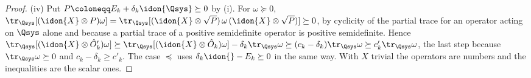 \begin{proof}
(iv) Put $P\coloneqq E_k+\delta_k\idon{\Qsys}\succeq0$ by (i). For
$\omega\succeq0$,
$\tr_{\Qsys}[(\idon{X}\otimes P)\omega]
=\tr_{\Qsys}[(\idon{X}\otimes\sqrt P)\,\omega\,(\idon{X}\otimes\sqrt P)]
\succeq0$, by cyclicity of the partial trace for an operator acting on
$\Qsys$ alone and because a partial trace of a positive semidefinite operator
is positive semidefinite. Hence
$\tr_{\Qsys}[(\idon{X}\otimes\hat O'_k)\omega]\succeq
\tr_{\Qsys}[(\idon{X}\otimes\hat O_k)\omega]-\delta_k\tr_{\Qsys}\omega
\succeq(c_k-\delta_k)\tr_{\Qsys}\omega\succeq c'_k\tr_{\Qsys}\omega$, the
last step because $\tr_{\Qsys}\omega\succeq0$ and $c_k-\delta_k\ge c'_k$. The
case $\preceq$ uses $\delta_k\idon{}-E_k\succeq0$ in the same way. With $X$
trivial the operators are numbers and the inequalities are the scalar ones.
\end{proof}
